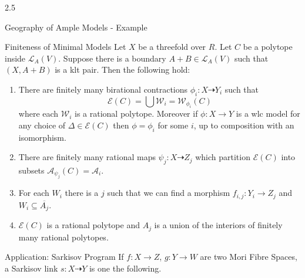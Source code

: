 \documentclass[final]{beamer}
\newlength{\colwidth}
\begin{document}
\begin{frame}[t, fragile]
\begin{columns}[t]
\begin{column}{2.5\colwidth}
\begin{block}{Geography of Ample Models - Example}
\begin{center}
\begin{tikzpicture}[x=0.75pt,y=0.75pt,yscale=-2,xscale=2]
					\end{tikzpicture}
				\end{center}
			\end{block}
			\begin{alertblock}{Finiteness of Minimal Models}
				Let $X$ be a threefold over $R$. Let $C$ be a polytope inside $\mathcal{L}_{A}(V)$. Suppose there is a boundary $A+B \in \mathcal{L}_{A}(V)$ such that $(X,A+B)$ is a klt pair. Then the following hold:
				
				\begin{enumerate}
					\item There are finitely many birational contractions $\phi_{i}:X \dashrightarrow Y_{i}$ such that 
					\[\mathcal{E}(C) = \bigcup \mathcal{W}_{i}=\mathcal{W}_{\phi_{i}}(C)\]
					where each $\mathcal{W}_{i}$ is a rational polytope. Moreover if $\phi:X \to Y$ is a wlc model for any choice of $\Delta \in \mathcal{E}(C)$ then $\phi=\phi_{i}$ for some $i$, up to composition with an isomorphism.
					
					\item There are finitely many rational maps $\psi_{j}:X \dashrightarrow Z_{j}$ which partition $\mathcal{E}(C)$ into subsets $\mathcal{A}_{\psi_{j}}(C)=\mathcal{A}_{i}$.
					\item  For each $W_{i}$ there is a $j$ such that we can find a morphism $f_{i,j}: Y_{i} \to Z_{j}$ and $W_{i} \subseteq \overline{A_{j}}$.
					\item  $\mathcal{E}(C)$ is a rational polytope and $A_{j}$ is a union of the interiors of finitely many rational polytopes.
				\end{enumerate}
			\end{alertblock}
			
			\begin{block}{Application: Sarkisov Program}
				If $f:X \to Z$, $g:Y \to W$ are two Mori Fibre Spaces, a Sarkisov link $s:X \dashrightarrow Y$ is one the following.
				

\end{block}
\end{column}
\end{columns}
\end{frame}
\end{document}
